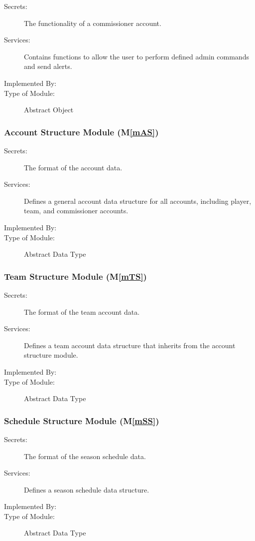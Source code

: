 \documentclass[12pt, titlepage]{article}
\newcommand{\mref}[1]{M\ref{#1}}
\begin{document}
\begin{description}
  \item[Secrets:]The functionality of a commissioner account.
  \item[Services:]Contains functions to allow the user to perform defined
  admin commands and send alerts.
  \item[Implemented By:] \progname{}
  \item[Type of Module:] Abstract Object
\end{description}

\subsubsection{Account Structure Module (\mref{mAS})}

\begin{description}
  \item[Secrets:]The format of the account data.
  \item[Services:]Defines a general account data structure for all accounts,
  including player, team, and commissioner accounts.
  \item[Implemented By:] \progname{}
  \item[Type of Module:] Abstract Data Type
\end{description}

\subsubsection{Team Structure Module (\mref{mTS})}

\begin{description}
  \item[Secrets:]The format of the team account data.
  \item[Services:]Defines a team account data structure that inherits from the
  account structure module.
  \item[Implemented By:] \progname{}
  \item[Type of Module:] Abstract Data Type
\end{description}

\subsubsection{Schedule Structure Module (\mref{mSS})}

\begin{description}
  \item[Secrets:]The format of the season schedule data.
  \item[Services:]Defines a season schedule data structure.
  \item[Implemented By:] \progname{}
  \item[Type of Module:] Abstract Data Type
\end{description}
\end{document}
